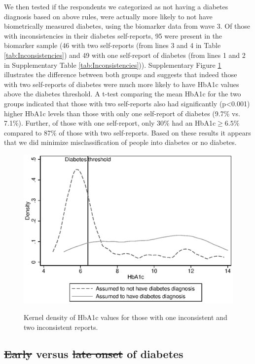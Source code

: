\documentclass[12pt,english]{article}
\providecommand{\DIFaddtex}[1]{{\protect\color{blue}\uwave{#1}}} %
\providecommand{\DIFdeltex}[1]{{\protect\color{red}\sout{#1}}}                      %
\providecommand{\DIFaddbegin}{} %
\providecommand{\DIFaddend}{} %
\providecommand{\DIFdelbegin}{} %
\providecommand{\DIFdelend}{} %
\providecommand{\DIFadd}[1]{\texorpdfstring{\DIFaddtex{#1}}{#1}} %
\providecommand{\DIFdel}[1]{\texorpdfstring{\DIFdeltex{#1}}{}} %
\begin{document}
We then tested if the respondents we categorized as not having a diabetes diagnosis based on above rules, were actually more likely to not have biometrically measured diabetes, using the biomarker data from wave 3. Of those with inconsistencies in their diabetes self-reports, 95 were present in the biomarker sample (46 with two self-reports (from lines 3 and 4 in Table \ref{tab:Inconsistencies}) and 49 with one self-report of diabetes (from lines 1 and 2 in Supplementary Table \ref{tab:Inconsistencies})). Supplementary Figure \ref{fig:kdens_inconsistency_hba1c} illustrates the difference between both groups and suggests that indeed those with two self-reports of diabetes were much more likely to have \ac{HbA1c} values above the diabetes threshold. A t-test comparing the mean \ac{HbA1c} for the two groups indicated that those with two self-reports also had significantly (p<0.001) higher \ac{HbA1c} levels than those with only one self-report of diabetes (9.7\% vs. 7.1\%). Further, of those with one self-report,  only 30\% had an \ac{HbA1c}$\geq6.5$\% compared to 87\% of those with two self-reports. Based on these results it appears that we did minimize misclassification of people into diabetes or no diabetes. 

\begin{figure}[h!]
	\caption{\label{fig:kdens_inconsistency_hba1c}Kernel density of HbA1c values for those with one inconsistent and two inconsistent reports.}%
	\begin{center}
		\includegraphics[width=.7\linewidth]{figures/kdensity_hba1c_inconsist.eps}\\
	\end{center}
\end{figure}


\clearpage

\subsection*{\DIFdelbegin \DIFdel{Early }\DIFdelend \DIFaddbegin \DIFadd{Early- }\DIFaddend versus \DIFdelbegin \DIFdel{late onset }\DIFdelend \DIFaddbegin \DIFadd{late-onset }\DIFaddend of diabetes}
\end{document}
